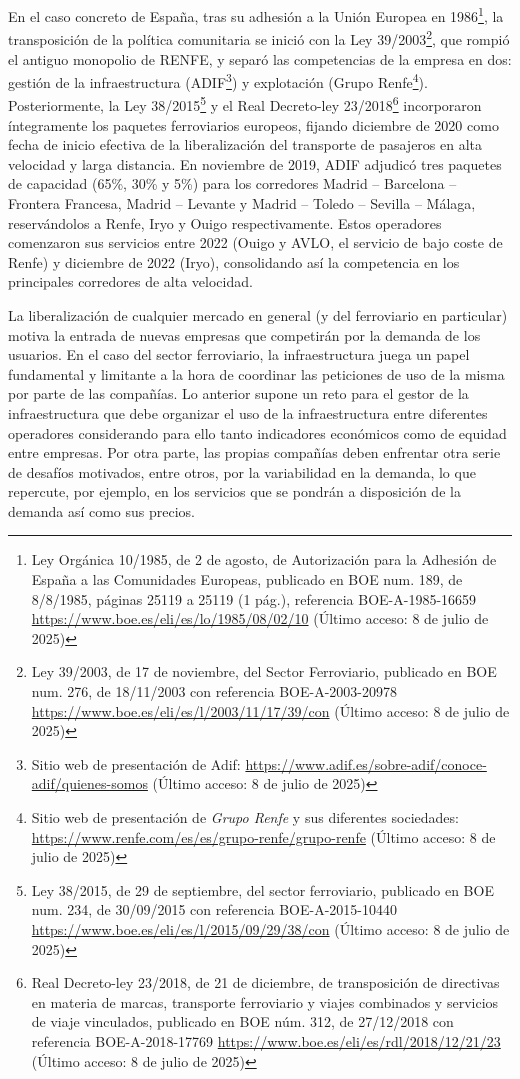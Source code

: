 En el caso concreto de España, tras su adhesión a la Unión Europea en 1986\footnote{Ley Orgánica 10/1985, de 2 de agosto, de Autorización para la Adhesión de España a las Comunidades Europeas, publicado en BOE num. 189, de 8/8/1985, páginas 25119 a 25119 (1 pág.), referencia BOE-A-1985-16659 \url{https://www.boe.es/eli/es/lo/1985/08/02/10} (Último acceso: 8 de julio de 2025)}, la transposición de la política comunitaria se inició con la Ley 39/2003\footnote{Ley 39/2003, de 17 de noviembre, del Sector Ferroviario, publicado en BOE num. 276, de 18/11/2003 con referencia BOE-A-2003-20978 \url{https://www.boe.es/eli/es/l/2003/11/17/39/con} (Último acceso: 8 de julio de 2025)}, que rompió el antiguo monopolio de RENFE, y separó las competencias de la empresa en dos: gestión de la infraestructura (ADIF\footnote{Sitio web de presentación de Adif: \url{https://www.adif.es/sobre-adif/conoce-adif/quienes-somos} (Último acceso: 8 de julio de 2025)}) y explotación (Grupo Renfe\footnote{Sitio web de presentación de \textit{Grupo Renfe} y sus diferentes sociedades: \url{https://www.renfe.com/es/es/grupo-renfe/grupo-renfe} (Último acceso: 8 de julio de 2025)}). Posteriormente, la Ley 38/2015\footnote{Ley 38/2015, de 29 de septiembre, del sector ferroviario, publicado en BOE num. 234, de 30/09/2015 con referencia BOE-A-2015-10440 \url{https://www.boe.es/eli/es/l/2015/09/29/38/con} (Último acceso: 8 de julio de 2025)} y el Real Decreto-ley 23/2018\footnote{Real Decreto-ley 23/2018, de 21 de diciembre, de transposición de directivas en materia de marcas, transporte ferroviario y viajes combinados y servicios de viaje vinculados, publicado en BOE núm. 312, de 27/12/2018 con referencia BOE-A-2018-17769 \url{https://www.boe.es/eli/es/rdl/2018/12/21/23} (Último acceso: 8 de julio de 2025)} incorporaron íntegramente los paquetes ferroviarios europeos, fijando diciembre de 2020 como fecha de inicio efectiva de la liberalización del transporte de pasajeros en alta velocidad y larga distancia. En noviembre de 2019, ADIF adjudicó tres paquetes de capacidad (65\%, 30\% y 5\%) para los corredores Madrid -- Barcelona -- Frontera Francesa, Madrid -- Levante y Madrid -- Toledo -- Sevilla -- Málaga, reservándolos a Renfe, Iryo y Ouigo respectivamente. Estos operadores comenzaron sus servicios entre 2022 (Ouigo y AVLO, el servicio de bajo coste de Renfe) y diciembre de 2022 (Iryo), consolidando así la competencia en los principales corredores de alta velocidad.

La liberalización de cualquier mercado en general (y del ferroviario en particular) motiva la entrada de nuevas empresas que competirán por la demanda de los usuarios. En el caso del sector ferroviario, la infraestructura juega un papel fundamental y limitante a la hora de coordinar las peticiones de uso de la misma por parte de las compañías. Lo anterior supone un reto para el gestor de la infraestructura que debe organizar el uso de la infraestructura entre diferentes operadores considerando para ello tanto indicadores económicos como de equidad entre empresas. Por otra parte, las propias compañías deben enfrentar otra serie de desafíos motivados, entre otros, por la variabilidad en la demanda, lo que repercute, por ejemplo, en los servicios que se pondrán a disposición de la demanda así como sus precios.

